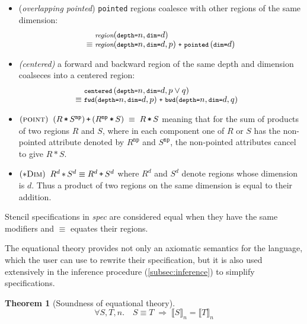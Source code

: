 \documentclass[10pt,preprint]{sigplanconf}
\newcounter{block}
\theoremstyle{definition}
\newtheorem{theorem}[block]{Theorem}
\newcommand{\interp}[1]{\llbracket{#1}\rrbracket}
\newcommand{\term}[1]{\texttt{#1}}
\newcommand{\stenCen}[3]{\term{centered} \, (\term{depth=}#1,
  \term{dim=}#2{#3})}
\newcommand{\stenReflS}[1]{\term{pointed} \, (\term{dim=}#1)}
\newcommand{\irreflS}{\texttt{np}}
\newcommand{\stenFwdSR}[3]{\term{fwd} (\term{depth=}#1,
  \term{dim=}#2, #3)}
\newcommand{\stenBwdSR}[3]{\term{bwd} (\term{depth=}#1,
  \term{dim=}#2, #3)}
\begin{document}
\begin{itemize}
\item (\textit{overlapping pointed}) \term{pointed} regions coalesce with other regions of the
same dimension:
%
\begin{align*}
& \stenG{n}{d}{region} \\[-0.4em]
\equiv \; & \stenGR{n}{d}{p}{region} \; \texttt{+} \;
                          \stenReflS{d}
\end{align*}
%
\item \textit{(centered)} a forward and backward region of the same
  depth and dimension coalseces into a centered region:
\begin{align*}
\hspace{-1em} & {\small{\stenCen{n}{d}{, p \vee q}}} \\[-0.4em]
\hspace{-1em} \equiv \; & {\small{\stenFwdSR{n}{d}{p} \; \texttt{+} \;
                          \stenBwdSR{n}{d}{q}}}
\end{align*}
\item $(\textsc{point}) \;\; (R \, \term{*} \, S^\irreflS) \, \term{+} \,
                         (R^\irreflS \, \term{*} \, S) \; \equiv \; R
                         \, \term{*} \, S$
meaning that for the sum of products of two regions $R$ and $S$,
where in each component one of $R$ or $S$ has the non-pointed
attribute denoted by $R^{\term{np}}$ and $S^{\term{np}}$,
the non-pointed attributes cancel to give $R \, \term{*} \, S$.
%
\item $(\textsc{$\ast$Dim}) \;\; R^d \, \term{$\ast$} \, S^d \equiv R^d
                             \, \term{+} \, S^d$
%
where $R^d$ and $S^d$ denote regions whose dimension is $d$.
Thus a product of two regions on
the same dimension is equal to their addition.
\end{itemize}
%
Stencil specifications in \textit{spec} are considered
equal when they have the same modifiers and $\equiv$ equates
their regions.

The equational theory provides not only an axiomatic semantics
for the language, which the user can use to rewrite their
specification, but it is also used extensively in the inference
procedure (\cref{subsec:inference}) to simplify specifications.

\begin{theorem}[Soundness of equational theory]
\begin{equation*}
\forall S, T, n . \quad
S \equiv T \; \Rightarrow \;
\interp{S}_n = \interp{T}_n
\end{equation*}
\end{theorem}
\end{document}
